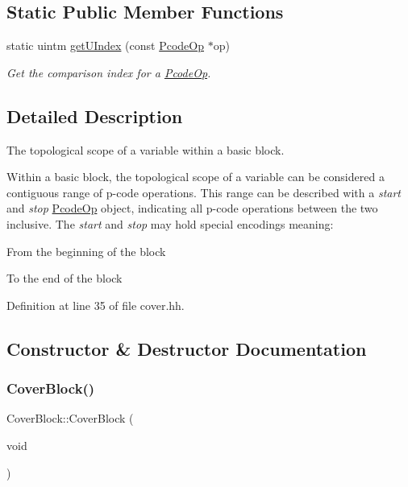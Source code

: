 \subsection*{Static Public Member Functions}
\begin{DoxyCompactItemize}
\item 
static uintm \mbox{\hyperlink{class_cover_block_ad0e8085aae35a181fd4c1666f53429ee}{get\+U\+Index}} (const \mbox{\hyperlink{class_pcode_op}{Pcode\+Op}} $\ast$op)
\begin{DoxyCompactList}\small\item\em Get the comparison index for a \mbox{\hyperlink{class_pcode_op}{Pcode\+Op}}. \end{DoxyCompactList}\end{DoxyCompactItemize}


\subsection{Detailed Description}
The topological scope of a variable within a basic block. 

Within a basic block, the topological scope of a variable can be considered a contiguous range of p-\/code operations. This range can be described with a {\itshape start} and {\itshape stop} \mbox{\hyperlink{class_pcode_op}{Pcode\+Op}} object, indicating all p-\/code operations between the two inclusive. The {\itshape start} and {\itshape stop} may hold special encodings meaning\+:
\begin{DoxyItemize}
\item From the beginning of the block
\item To the end of the block 
\end{DoxyItemize}

Definition at line 35 of file cover.\+hh.



\subsection{Constructor \& Destructor Documentation}
\mbox{\label{class_cover_block_a1b86770acf90e77a85a9a5b3f7f408f6}} 
\subsubsection{\texorpdfstring{CoverBlock()}{CoverBlock()}}
{\footnotesize\ttfamily Cover\+Block\+::\+Cover\+Block (\begin{DoxyParamCaption}\item[{void}]{ }\end{DoxyParamCaption})\hspace{0.3cm}{\ttfamily [inline]}}



